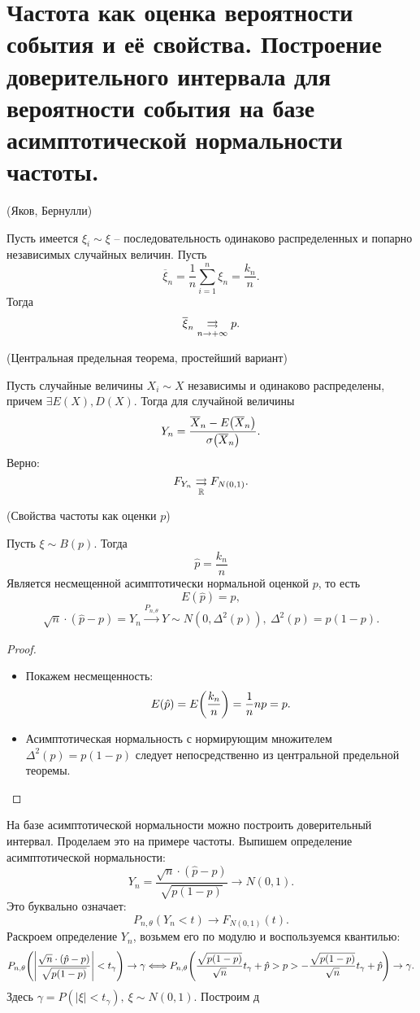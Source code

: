 \section{Частота как оценка вероятности события и её свойства.
    Построение доверительного интервала для вероятности события
на базе асимптотической нормальности частоты.}

\begin{theorem}(Яков, Бернулли)

	Пусть имеется $\xi_i \sim \xi$ -- последовательность одинаково 
	распределенных и попарно независимых случайных величин. Пусть
	\[
		\overline{\xi}_n = \frac{1}{n} \sum_{i = 1}^n{\xi_n} = \frac{k_n}{n}
	.\]
	Тогда
	\[
		\overline{\xi}_n \underset{n \to +\infty}{\rightrightarrows} p
	.\]
\end{theorem}

\begin{theorem}(Центральная предельная теорема, простейший вариант)

	Пусть случайные величины $X_i \sim X$ независимы и одинаково распределены,
	причем $\exists E(X), D(X)$. Тогда для случайной величины
	\[
		Y_n = \frac{\overline{X}_n - E\parens*{\overline{X}_n}}
	{\sigma\parens*{\overline{X}_n}}
	.\]
	Верно:
	\[
		F_{Y_n} \underset{\mathbb{R}}{\rightrightarrows} F_{N(0, 1)}
	.\]
\end{theorem}

\begin{theorem}(Свойства частоты как оценки $p$)

	Пусть $\xi \sim B(p)$. Тогда 
	\[
		\hat{p} = \frac{k_n}{n}
	\]
	Является несмещенной асимптотически нормальной оценкой $p$, то есть
	\[
		E(\hat{p}) = p,
	\]
	\[
		\sqrt{n} \cdot (\hat{p} - p) = Y_n \xrightarrow[]{P_{n, \theta}} Y 
	\sim N(0, \Delta^2(p)),~ \Delta^2(p) = p(1 - p)
	.\]
\end{theorem}
\begin{proof}
	\enewline
	\begin{itemize}
		\item Покажем несмещенность:
			\[
				E(\hat{p}) = E\parens*{\frac{k_n}{n}} = \frac{1}{n} np = p
			.\]
		\item Асимптотическая нормальность с нормирующим множителем
			$\Delta^2(p) = p(1 - p)$ следует непосредственно из
			центральной предельной теоремы.
	\end{itemize}
\end{proof}

На базе асимптотической нормальности можно построить доверительный интервал.
Проделаем это на примере частоты. Выпишем определение асимптотической
нормальности:
\[
	Y_n = \frac{\sqrt{n} \cdot (\hat{p} - p)}{\sqrt{p(1 - p)}} \to N(0, 1)
.\]
Это буквально означает:
\[
	P_{n, \theta}(Y_n < t) \to F_{N(0, 1)}(t) 
.\]
Раскроем определение $Y_n$, возьмем его по модулю и воспользуемся квантилью:
\[
	P_{n, \theta}\parens*{\abs*{\frac{\sqrt{n} 
    \cdot (\hat{p} - p)}{\sqrt{p(1 - p)}} } < t_\gamma} \to \gamma \Llra
    P_{n, \theta}\parens*{\frac{\sqrt{p(1 - p)}}{\sqrt{n}}t_\gamma + \hat{p}
    > p > -\frac{\sqrt{p(1 - p)}}{\sqrt{n}}t_\gamma + \hat{p}} \to \gamma
.\]
Здесь $\gamma = P(|\xi| < t_\gamma),~ \xi \sim N(0, 1)$.
Построим д

